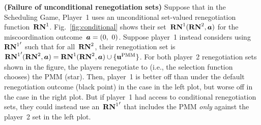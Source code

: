 \documentclass[sigconf]{aamas}
\theoremstyle{definition}
\begin{document}
\begin{exmp}
\label{ex:cond}
\textbf{(Failure of unconditional renegotiation sets)} 
    Suppose that
    in the Scheduling Game,
    Player~1 uses an
    unconditional
    set-valued renegotiation function~$\mathbf{RN}^{1}$.
    Fig.~\ref{fig:conditional}
    shows
    their set~$\mathbf{RN}^{1}(\mathbf{RN}^{2}, \boldsymbol{a})$
    for the miscoordination
    outcome~$\boldsymbol{a} = (0,~0)$.
    Suppose player~1 
    instead considers
    using~${\mathbf{RN}^{1}}'$
    such that for all~$\mathbf{RN}^{2}$,
    their renegotiation set is
    ${\mathbf{RN}^{1}}'(\mathbf{RN}^{2}, \boldsymbol{a}) = \mathbf{RN}^{1}(\mathbf{RN}^{2}, \boldsymbol{a}) \cup \{\textbf{u}^{\textnormal{PMM}}\}$. 
    For both player~2 renegotiation sets
    shown in the figure,
    the players renegotiate to 
    (i.e., the selection function chooses) the PMM (star).
    Then,
    player~1 is better off than under the default renegotiation outcome (black point)
    in the case in the left plot,
    but worse off
    in the case in the right plot. 
    But if player~1 had access
    to conditional
    renegotiation sets,
    they could instead use an~${\mathbf{RN}^{1}}'$
    that
    includes the PMM
    \textit{only}
    against the player~2
    set in the left plot.
\end{exmp}

\end{document}
